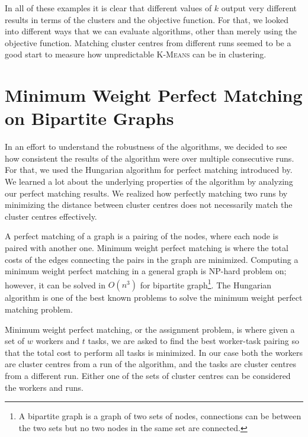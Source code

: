 \documentclass[12pt]{dalthesis}
\newcommand*{\kmeans}{\textsc{K-Means} } %
\begin{document}
In all of these examples it is clear that different values of $k$ output very different results in terms of the clusters and the objective function. For that, we looked into different ways that we can evaluate algorithms, other than merely using the objective function. Matching cluster centres from different runs seemed to be a good start to measure how unpredictable \kmeans can be in clustering. 

\section{Minimum Weight Perfect Matching on Bipartite Graphs}
In an effort to understand the robustness of the algorithms, we decided to see how consistent the results of the algorithm were over multiple consecutive runs. For that, we used the Hungarian algorithm for perfect matching introduced by\cite{kuhn}. We learned a lot about the underlying properties of the algorithm by analyzing our perfect matching results. We realized how perfectly matching two runs by minimizing the distance between cluster centres does not necessarily match the cluster centres effectively.

A perfect matching of a graph is a pairing of the nodes, where each node is paired with another one. Minimum weight perfect matching is where the total costs of the edges connecting the pairs in the graph are minimized. Computing a minimum weight perfect matching in a general graph is NP-hard problem on; however, it can be solved in $O(n^3)$ for bipartite graph\footnote{A bipartite graph is a graph of two sets of nodes, connections can be between the two sets but no two nodes in the same set are connected.}. The Hungarian algorithm is one of the best known problems to solve the minimum weight perfect matching problem.

Minimum weight perfect matching, or the assignment problem, is where given a set of $w$ workers and $t$ tasks, we are asked to find the best worker-task pairing so that the total cost to perform all tasks is minimized. In our case both the workers are cluster centres from a run of the algorithm, and the tasks are cluster centres from a different run. Either one of the sets of cluster centres can be considered the workers and runs.  
\end{document}
